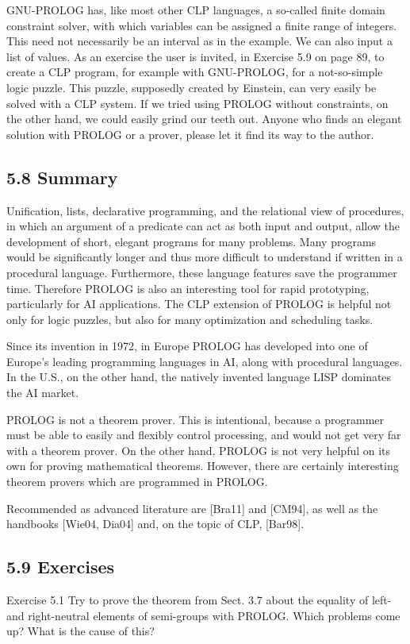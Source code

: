 \documentclass[10pt]{article}
\begin{document}
GNU-PROLOG has, like most other CLP languages, a so-called finite domain constraint solver, with which variables can be assigned a finite range of integers. This need not necessarily be an interval as in the example. We can also input a list of values. As an exercise the user is invited, in Exercise 5.9 on page 89, to create a CLP program, for example with GNU-PROLOG, for a not-so-simple logic puzzle. This puzzle, supposedly created by Einstein, can very easily be solved with a CLP system. If we tried using PROLOG without constraints, on the other hand, we could easily grind our teeth out. Anyone who finds an elegant solution with PROLOG or a prover, please let it find its way to the author.

\subsection*{5.8 Summary}
Unification, lists, declarative programming, and the relational view of procedures, in which an argument of a predicate can act as both input and output, allow the development of short, elegant programs for many problems. Many programs would be significantly longer and thus more difficult to understand if written in a procedural language. Furthermore, these language features save the programmer time. Therefore PROLOG is also an interesting tool for rapid prototyping, particularly for AI applications. The CLP extension of PROLOG is helpful not only for logic puzzles, but also for many optimization and scheduling tasks.

Since its invention in 1972, in Europe PROLOG has developed into one of Europe's leading programming languages in AI, along with procedural languages. In the U.S., on the other hand, the natively invented language LISP dominates the AI market.

PROLOG is not a theorem prover. This is intentional, because a programmer must be able to easily and flexibly control processing, and would not get very far with a theorem prover. On the other hand, PROLOG is not very helpful on its own for proving mathematical theorems. However, there are certainly interesting theorem provers which are programmed in PROLOG.

Recommended as advanced literature are [Bra11] and [CM94], as well as the handbooks [Wie04, Dia04] and, on the topic of CLP, [Bar98].

\subsection*{5.9 Exercises}
Exercise 5.1 Try to prove the theorem from Sect. 3.7 about the equality of left- and right-neutral elements of semi-groups with PROLOG. Which problems come up? What is the cause of this?
\end{document}
